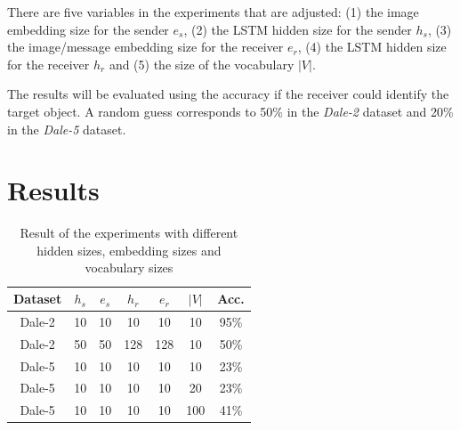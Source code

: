 \documentclass[11pt]{article}
\begin{document}
There are five variables in the experiments that are adjusted:
(1) the image embedding size for the sender $e_s$, (2) the LSTM hidden size for the sender $h_s$, (3) the image/message embedding size for the receiver $e_r$, (4) the LSTM hidden size for the receiver $h_r$ and (5) the size of the vocabulary $|V|$.

The results will be evaluated using the accuracy if the receiver could identify the target object.
A random guess corresponds to 50\% in the \emph{Dale-2} dataset and 20\% in the \emph{Dale-5} dataset.

\section{Results}

\begin{table}
  \centering
  \begin{tabular}{c|ccccc|c}
    \hline
    \textbf{Dataset} & $h_{s}$ & $e_{s}$ & $h_{r}$ & $e_{r}$ & $|V|$ & \textbf{Acc.} \\
    \hline
    Dale-2           & {10}    & {10}    & {10}    & {10}    & {10}  & {95\%}        \\
    Dale-2           & {50}    & {50}    & {128}   & {128}   & {10}  & {50\%}        \\
    Dale-5           & {10}    & {10}    & {10}    & {10}    & {10}  & {23\%}        \\
    Dale-5           & {10}    & {10}    & {10}    & {10}    & {20}  & {23\%}        \\
    Dale-5           & {10}    & {10}    & {10}    & {10}    & {100} & {41\%}        \\
    \hline
  \end{tabular}
  \caption{Result of the experiments with different hidden sizes, embedding sizes and vocabulary sizes}
  \label{tab:results}
\end{table}
\end{document}
